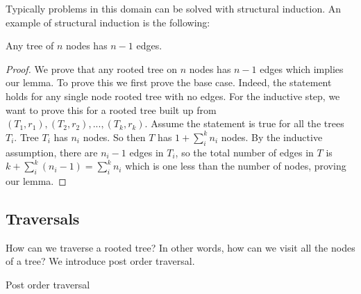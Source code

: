 Typically problems in this domain can be solved with structural
induction. An example of structural induction is the following:

\begin{lemma}
    Any tree of $n$ nodes has $n - 1$ edges.
\end{lemma}

\begin{proof}
    We prove that any rooted tree on $n$ nodes has $n - 1$ edges which
    implies our lemma. To prove this we first prove the base case.
    Indeed, the statement holds for any single node rooted tree with
    no edges. For the inductive step, we want to prove this for a
    rooted tree built up from $(T_1, r_1), (T_2, r_2), ..., (T_k,
    r_k)$. Assume the statement is true for all the trees $T_i$.
    Tree $T_i$ has $n_i$ nodes. So then $T$ has $1 + \sum_i^k n_i$
    nodes. By the inductive assumption, there are $n_i - 1$ edges in
    $T_i$, so the total number of edges in $T$ is 
    $k + \sum_i^k (n_i - 1) = \sum_i^k n_i$ which is one less than the
    number of nodes, proving our lemma.
\end{proof}

\subsection{Traversals}

How can we traverse a rooted tree? In other words, how can we visit
all the nodes of a tree? We introduce post order traversal.

\begin{algorithm}
\caption{Post order traversal}
\begin{algorithmic}
\ENDFOR
{}
\end{algorithmic}
\end{algorithm}
















